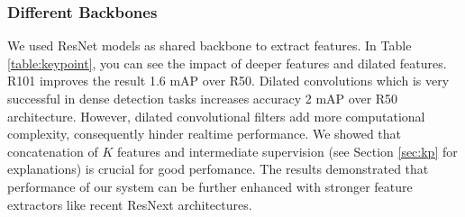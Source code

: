 \documentclass[runningheads]{llncs}
\begin{document}
\subsubsection{Different Backbones}
We used ResNet models\cite{He2016} as shared backbone to extract features. In Table \ref{table:keypoint}, you can see the impact of deeper features and dilated features. R101 improves the result 1.6 mAP over R50. Dilated convolutions \cite{Chen2016} which is very successful in dense detection tasks increases accuracy 2 mAP over R50 architecture. However, dilated convolutional filters add more computational complexity, consequently hinder realtime performance. We showed that concatenation of $K$ features and intermediate supervision (see Section \ref{sec:kp} for explanations) is crucial for good perfomance. The results demonstrated that performance of our system can be further enhanced with stronger feature extractors like recent ResNext \cite{Xie2016} architectures.


\begin{table}
\begin{center}
\caption{\textbf{Left:} Comparison of different keypoint models. \textbf{Right:} Performance of different backbone architectures. \textit{(no concat: no concatenation, no int: no intermediate supervision, dil: dilated, concat: concatenation)}}
\label{table:keypoint}
\quad
{}
\end{center}
\end{table}
\end{document}
